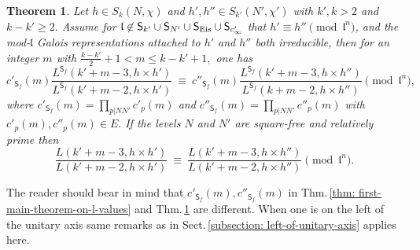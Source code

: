 \documentclass[11pt]{amsart}
\newtheorem{theorem}{Theorem}[section]
\begin{document}
\begin{theorem}
\label{thm: varying-the-lower-weight}
	Let $h \in S_k(N,\chi)$ and $h',h'' \in S_{k'}(N',\chi')$  with $k',k > 2$ and $k-k' \geq 2.$  
	Assume for $\mathfrak{l} \not\in \mathsf{S}_{k'} \cup \mathsf{S}_{N'} \cup \mathsf{S}_{\textup{Eis}} \cup \mathsf{S}_{c'_\infty}$ that 
	$h' \equiv h'' \pmod{\mathfrak{l}^n}$,  
	and the mod-$\mathfrak{l}$ Galois representations attached to $h' $ and $h''$ both irreducible, 
	then for an integer $m$ with $\frac{k-k'}{2} + 1 < m \leq k-k'+1,$ one has
	\begin{equation*}
		c'_{\mathsf{S}_f}(m)\frac{L^{\mathsf{S}_f}(k'+m-3, h\times h' )}{L^{\mathsf{S}_f}(k'+m-2, h\times h' )} \ \equiv \ 
		 c''_{\mathsf{S}_f}(m)\frac{L^{\mathsf{S}_f}(k'+m-3, h\times h'' )}{L^{\mathsf{S}_f}(k+m-2, h\times h'')} \pmod{\mathfrak{l}^n},
	\end{equation*} 
	where $c'_{\mathsf{S}_f}(m) = \prod_{p |NN'} c'_p(m)$ and $c''_{\mathsf{S}_f}(m) = \prod_{p |NN'} c''_p(m)$ with $c'_p(m),c''_p(m) \in E.$
	If the levels $N$ and $N'$ are square-free and relatively prime then
	\begin{equation*}
		\frac{L(k'+m-3, h\times h' )}{L(k'+m-2, h\times h' )}  \ \equiv \  \frac{L(k'+m-3, h\times h'' )}{L(k'+m-2, h\times h'')} \pmod{\mathfrak{l}^n}.
	\end{equation*}
\end{theorem}
The reader should bear in mind that $c'_{\mathsf{S}_f}(m), c''_{\mathsf{S}_f}(m)$ in Thm.\,\ref{thm: first-main-theorem-on-l-values} and 
Thm.\,\ref{thm: varying-the-lower-weight} are different. 
When one is on the left of the unitary axis same remarks as in Sect.\,\ref{subsection: left-of-unitary-axis} applies here.

\bigskip
\end{document}
